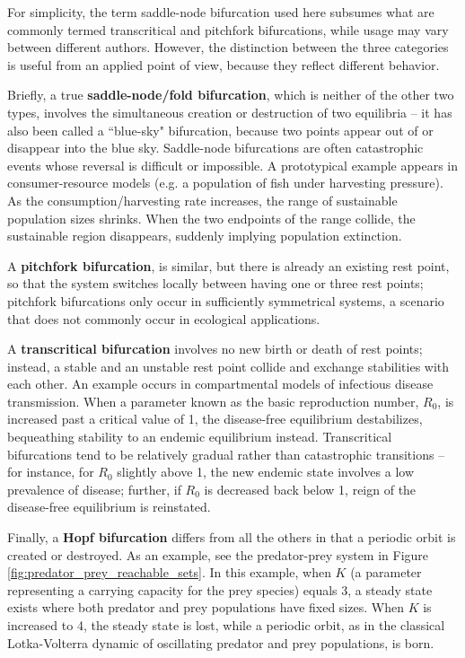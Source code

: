For simplicity, the term saddle-node bifurcation used here subsumes what are commonly termed transcritical and pitchfork bifurcations, while usage may vary between different authors. However, the distinction between the three categories is useful from an applied point of view, because they reflect different behavior. 

Briefly, a true \textbf{saddle-node/fold bifurcation}, which is neither of the other two types, involves the simultaneous creation or destruction of two equilibria -- it has also been called a ``blue-sky" bifurcation, because two points appear out of or disappear into the blue sky. Saddle-node bifurcations are often catastrophic events whose reversal is difficult or impossible. A prototypical example appears in consumer-resource models (e.g. a population of fish under harvesting pressure). As the consumption/harvesting rate increases, the range of sustainable population sizes shrinks. When the two endpoints of the range collide, the sustainable region disappears, suddenly implying population extinction. 

A \textbf{pitchfork bifurcation}, is similar, but there is already an existing rest point, so that the system switches locally between having one or three rest points; pitchfork bifurcations only occur in sufficiently symmetrical systems, a scenario that does not commonly occur in ecological applications. 

A \textbf{transcritical bifurcation} involves no new birth or death of rest points; instead, a stable and an unstable rest point collide and exchange stabilities with each other. An example occurs in compartmental models of infectious disease transmission. When a parameter known as the basic reproduction number, $R_0$, is increased past a critical value of 1, the disease-free equilibrium destabilizes, bequeathing stability to an endemic equilibrium instead. Transcritical bifurcations tend to be relatively gradual rather than catastrophic transitions -- for instance, for $R_0$ slightly above 1, the new endemic state involves a low prevalence of disease; further, if $R_0$ is decreased back below 1, reign of the disease-free equilibrium is reinstated. 

Finally, a \textbf{Hopf bifurcation} differs from all the others in that a periodic orbit is created or destroyed. As an example, see the predator-prey system in Figure \ref{fig:predator_prey_reachable_sets}. In this example, when $K$ (a parameter representing a carrying capacity for the prey species) equals 3, a steady state exists where both predator and prey populations have fixed sizes. When $K$ is increased to 4, the steady state is lost, while a periodic orbit, as in the classical Lotka-Volterra dynamic of oscillating predator and prey populations, is born.

